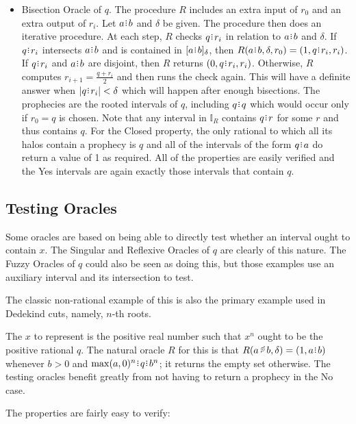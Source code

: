 \documentclass[12pt]{article}
\begin{document}
\begin{itemize}
    \item Bisection Oracle of $q$. The procedure $R$ includes an extra input of $r_0$ and an extra output of $r_i$. Let $a \rint b$ and $\delta$ be given. The procedure then does an iterative procedure.  At each step, $R$ checks $q \rint r_i$ in relation to $a \rint b$ and $\delta$. If $q \rint r_i$ intersects $a \rint b$ and is contained in $\halo{a \rint b}$, then $R(a \rint b, \delta, r_0) = (1, q \rint r_i, r_i)$. If $q \rint r_i$ and $a \rint b$ are disjoint, then $R$ returns $(0, q \rint r_i, r_i)$. Otherwise, $R$ computes $r_{i+1} = \frac{q + r_i}{2}$ and then runs the check again. This will have a definite answer when $|q \rint r_i| < \delta$ which will happen after enough bisections. The prophecies are the rooted intervals of $q$, including $q \rint q$ which would occur only if $r_0 = q$ is chosen. Note that any interval in $\mathbb{I}_R$ contains $q \rint r$ for some $r$ and thus contains $q$. For the Closed property, the only rational to which all its halos contain a prophecy is $q$ and all of the intervals of the form $q \rint a$ do return a value of 1 as required. All of the properties are easily verified and the Yes intervals are again exactly those intervals that contain $q$.
\end{itemize}

\subsection{Testing Oracles}

Some oracles are based on being able to directly test whether an interval ought to contain $x$. The Singular and Reflexive Oracles of $q$ are clearly of this nature. The Fuzzy Oracles of $q$ could also be seen as doing this, but those examples use an auxiliary interval and its intersection to test. 

The classic non-rational example of this is also the primary example used in Dedekind cuts, namely, $n$-th roots. 

The $x$ to represent is the positive real number such that $x^n$ ought to be the positive rational $q$. The natural oracle $R$ for this is that $R(a\lt b, \delta) = (1, a\rint b)$ whenever $b > 0$ and $\max(a, 0)^n\rint q\rint b^n$; it returns the empty set otherwise. The testing oracles benefit greatly from not having to return a prophecy in the No case. 

The properties are fairly easy to verify:
\end{document}
